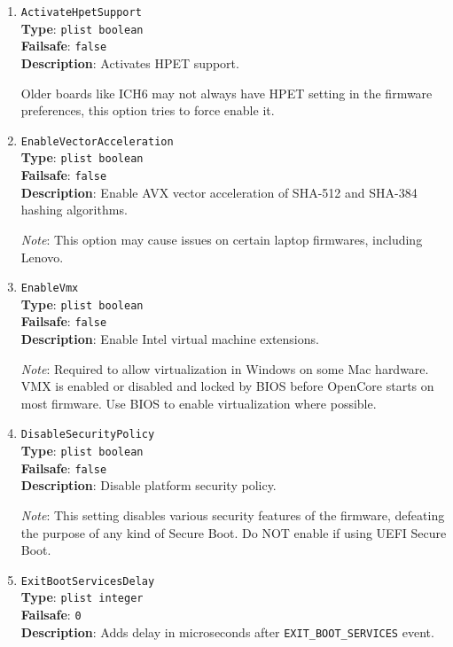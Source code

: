 \documentclass[]{article}
\begin{document}
\begin{enumerate}

\item
  \texttt{ActivateHpetSupport}\\
  \textbf{Type}: \texttt{plist\ boolean}\\
  \textbf{Failsafe}: \texttt{false}\\
  \textbf{Description}: Activates HPET support.

  Older boards like ICH6 may not always have HPET setting in the firmware preferences,
  this option tries to force enable it.

  \item
  \texttt{EnableVectorAcceleration}\\
  \textbf{Type}: \texttt{plist\ boolean}\\
  \textbf{Failsafe}: \texttt{false}\\
  \textbf{Description}: Enable AVX vector acceleration of SHA-512 and SHA-384 hashing algorithms.

  \emph{Note}: This option may cause issues on certain laptop firmwares, including Lenovo.

  \item
  \texttt{EnableVmx}\\
  \textbf{Type}: \texttt{plist\ boolean}\\
  \textbf{Failsafe}: \texttt{false}\\
  \textbf{Description}: Enable Intel virtual machine extensions.

  \emph{Note}: Required to allow virtualization in Windows on some Mac hardware. VMX
  is enabled or disabled and locked by BIOS before OpenCore starts on most
  firmware. Use BIOS to enable virtualization where possible.

  \item
  \texttt{DisableSecurityPolicy}\\
  \textbf{Type}: \texttt{plist\ boolean}\\
  \textbf{Failsafe}: \texttt{false}\\
  \textbf{Description}: Disable platform security policy.

  \emph{Note}: This setting disables various security features of the firmware,
  defeating the purpose of any kind of Secure Boot. Do NOT enable if using
  UEFI Secure Boot.

\item
  \texttt{ExitBootServicesDelay}\\
  \textbf{Type}: \texttt{plist\ integer}\\
  \textbf{Failsafe}: \texttt{0}\\
  \textbf{Description}: Adds delay in microseconds after \texttt{EXIT\_BOOT\_SERVICES}
  event.


\end{enumerate}
\end{document}
